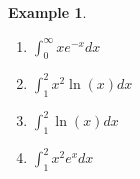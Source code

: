 \documentclass[12pt]{amsart}
\newtheorem{example}[theorem]{Example}
\newcommand\intd{\displaystyle\int}
\begin{document}
{\begin{example}
\begin{enumerate}
\item $\intd_0^{\infty} x e^{-x}dx$
\vspace{6cm}


\newpage
\item $\intd_1^2 x^2 \ln(x)dx$
\vspace{7cm}

\item $\intd_1^2 \ln(x)dx$
\vspace{7cm}

\item $\intd_1^2 x^2 e^{x}dx$
\vspace{6cm}
\end{enumerate}

\end{example}





}  %
\end{document}
